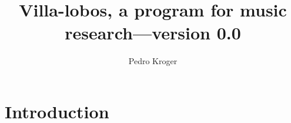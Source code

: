 \documentclass[11pt]{article}
\title{Villa-lobos, a program for music research---version 0.0}
\author{Pedro Kroger}
\begin{document}
\maketitle
\tableofcontents
\newpage

\section{Introduction}
\label{sec:introduction}
\end{document}
